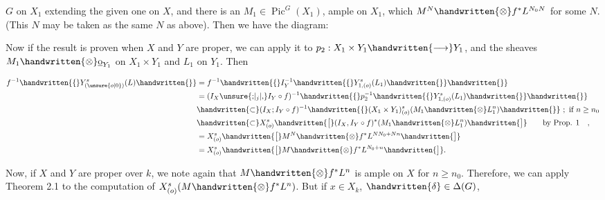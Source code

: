 
$G$ on $X_1$ extending the given one on $X$, and there is an $M_1\in\operatorname{Pic}^{G}(X_1)$, ample on $X_1$, which  $M^N\handwritten{\otimes}f^*L^{N_0N}$ for some $N$. (This $N$ may be taken as the same $N$ as above). Then we have the diagram:


Now if the result is proven when $X$ and $Y$ are proper, we can apply it to $p_2:X_1\times Y_1\handwritten{\longrightarrow} Y_1$, and the sheaves $M_1\handwritten{\otimes}\underline{\mathrm{o}}_{Y_1}$ on $X_1\times Y_1$ and $L_1$ on $Y_1$. Then

\[
\begin{aligned}
f^{-1}\handwritten{\{}Y^s_{(\unsure{o|0})}(L)\handwritten{\}}&=f^{-1}\handwritten{\{}I_Y^{-1}\handwritten{\{}Y^s_{1,(o)}(L_1)\handwritten{\}}\handwritten{\}}\\
&=(I_X\unsure{{;}|{}_{j}|{,}}I_Y\circ f)^{-1}\handwritten{\{}p_2^{-1}\handwritten{\{}Y^s_{1,(o)}(L_1)\handwritten{\}}\handwritten{\}}\\
&\handwritten{\subset}(I_X\mathpunct{;}I_Y\circ f)^{-1}\handwritten{\{}(X_1\times Y_1)^s_{(o)}(M_1\handwritten{\otimes}L_1^n)\handwritten{\}}\ ;\ \text{if }n\geq n_0\\
&\handwritten{\subset}X^s_{(o)}\handwritten{\bigl[}(I_X,I_Y\circ f)^*(M_1\handwritten{\otimes}L_1^n)\handwritten{\bigr]}\qquad\text{by Prop. 1}\quad,\\
&=X^s_{(o)}\handwritten{\bigl[}M^N\handwritten{\otimes} f^*L^{NN_0+Nn}\handwritten{\bigr]}\\
&=X^s_{(o)}\handwritten{\bigl[}M\handwritten{\otimes} f^*L^{N_0+n}\handwritten{\bigr]}.
\end{aligned}
\]

Now, if $X$ and $Y$ are proper over $k$, we note again that $M\handwritten{\otimes} f^*L^n$ is ample on $X$ for $n\geq n_0$. Therefore, we can apply Theorem 2.1 to the computation of $X^s_{(o)}(M\handwritten{\otimes} f^*L^n)$. But if $x\in X_k$, $\handwritten{\delta}\in\Delta(G)$,


